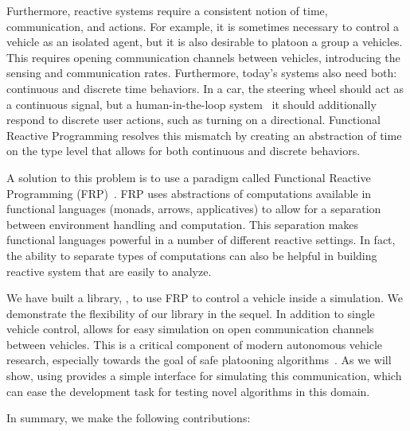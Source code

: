 Furthermore, reactive systems require a consistent notion of time, communication, and actions.
For example, it is sometimes necessary to control a vehicle as an isolated agent, but it is also desirable to platoon a group a vehicles.
This requires opening communication channels between vehicles, introducing the sensing and communication rates.
Furthermore, today's systems also need both: continuous and discrete time behaviors.
In a car, the steering wheel should act as a continuous signal, but a human-in-the-loop system~\cite{li2014synthesis} it should additionally respond to discrete user actions, such as turning on a directional.
Functional Reactive Programming resolves this mismatch by creating an abstraction of time on the type level that allows for both continuous and discrete behaviors.

A solution to this problem is to use a paradigm called Functional Reactive Programming (FRP)~\cite{hudak2003arrows,hudak2000haskell}.
FRP uses abstractions of computations available in functional languages (\eg monads, arrows, applicatives) to allow for a separation between environment handling and computation.
This separation makes functional languages powerful in a number of different reactive settings.
In fact, the ability to separate types of computations can also be helpful in building reactive system that are easily to analyze.

We have built a library, \ourLib, to use FRP to control a vehicle inside a simulation.
We demonstrate the flexibility of our library in the sequel.
In addition to single vehicle control, \ourLib allows for easy simulation on open communication channels between vehicles.
This is a critical component of modern autonomous vehicle research, especially towards the goal of safe platooning algorithms~\cite{?}.
As we will show, using \ourLib provides a simple interface for simulating this communication, which can ease the development task for testing novel algorithms in this domain.

In summary, we make the following contributions:

